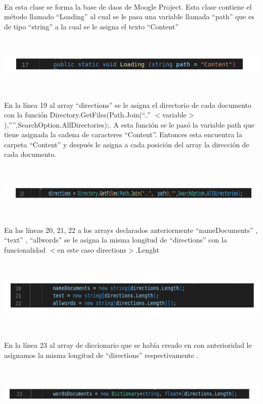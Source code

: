 \documentclass{article}
\begin{document}
{\

En esta clase se forma la base de daos de Moogle Project.
Esta clase contiene el método llamado “Loading” al cual se le pasa una variable llamada “path” que es
de tipo “string” a la cual se le asigna el texto “Content” 

\

\centering
\includegraphics[height = 0.8 cm ]{Captura desde 2023-07-18 11-16-29.png}

\

En la línea 19 al array “directions” se le asigna el directorio de cada documento con la función 
Directory.GetFiles(Path.Join(“..” $<$variable$>$),””,SearchOption.AllDirectories);. 
A esta función se le pasó la variable path que tiene asignada la cadena de caracteres “Content”. 
Entonces esta encuentra la carpeta “Content” y después le asigna a cada posición del array la dirección de cada documento.

\

\centering
\includegraphics[height = 0.7 cm ]{Captura desde 2023-07-18 21-14-03.png}

\

En las líneas 20, 21, 22  a los arrays declarados anteriormente “nameDocuments” , “text” , “allwords”  
se le asigna la misma longitud de “directions” con la funcionalidad  $<$en este caso directions$>$.Lenght

\

\centering
\includegraphics[height = 1.6 cm ]{Captura desde 2023-07-18 21-21-46.png}

\

En la línea 23 al array de diccionario que se había creado en con anterioridad le asignamos la misma longitud de “directions” respectivamente .

\

\centering
\includegraphics[height = 0.7 cm ]{Captura desde 2023-07-18 21-25-05.png}

}
\end{document}
